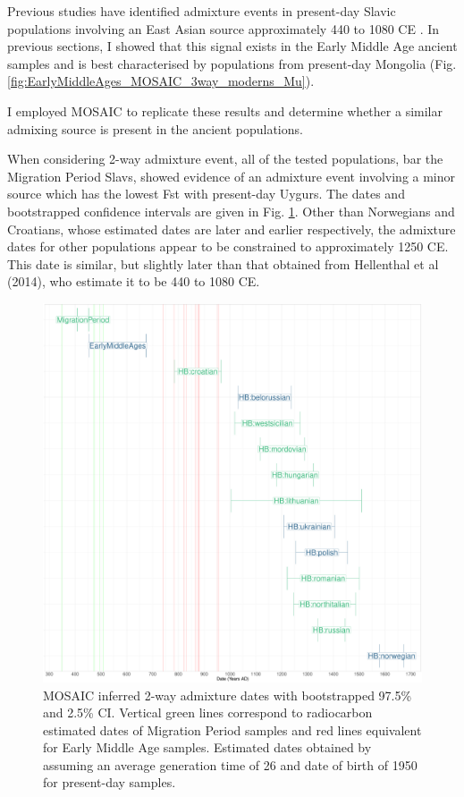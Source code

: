 Previous studies have identified admixture events in present-day Slavic populations involving an East Asian source approximately 440 to 1080 CE \cite{Hellenthal2016, MOSAIC_2019}. In previous sections, I showed that this signal exists in the Early Middle Age ancient samples and is best characterised by populations from present-day Mongolia (Fig. \ref{fig:EarlyMiddleAges_MOSAIC_3way_moderns_Mu}). 

I employed MOSAIC \cite{MOSAIC_2019} to replicate these results and determine whether a similar admixing source is present in the ancient populations. 

When considering 2-way admixture event, all of the tested populations, bar the Migration Period Slavs, showed evidence of an admixture event involving a minor source which has the lowest Fst with present-day Uygurs. The dates and bootstrapped confidence intervals are given in Fig. \ref{fig:MOSAIC_admixture_dates_plot}. Other than Norwegians and Croatians, whose estimated dates are later and earlier respectively, the admixture dates for other populations appear to be constrained to approximately 1250 CE. This date is similar, but slightly later than that obtained from Hellenthal et al (2014), who estimate it to be 440 to 1080 CE. 

\begin{figure}[htp]
    \centering
    \includegraphics[width=1.0\textwidth]{../images/chapter5/MOSAIC_admixture_dates_plot.pdf}
    \caption{MOSAIC inferred 2-way admixture dates with bootstrapped 97.5\% and 2.5\% CI. Vertical green lines correspond to radiocarbon estimated dates of Migration Period samples and red lines equivalent for Early Middle Age samples. Estimated dates obtained by assuming an average generation time of 26 and date of birth of 1950 for present-day samples.}
    \label{fig:MOSAIC_admixture_dates_plot}
\end{figure} 

